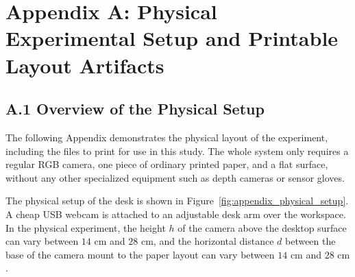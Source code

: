 \chapter*{Appendix A: Physical Experimental Setup and Printable Layout Artifacts}
\label{ch:appendix_physical_setup}

\section*{A.1 Overview of the Physical Setup}
\label{sec:appendix_setup_overview}
The following Appendix demonstrates the physical layout of the experiment, including the files to print for use in this study. The whole system only requires a regular RGB camera, one piece of ordinary printed paper, and a flat surface, without any other specialized equipment such as depth cameras or sensor gloves.

The physical setup of the desk is shown in Figure~\ref{fig:appendix_physical_setup}. A cheap USB webcam is attached to an adjustable desk arm over the workspace. In the physical experiment, the height $h$ of the camera above the desktop surface can vary between $14\text{ cm}$ and $28\text{ cm}$, and the horizontal distance $d$ between the base of the camera mount to the paper layout can vary between $14\text{ cm}$ and $28\text{ cm}$.

